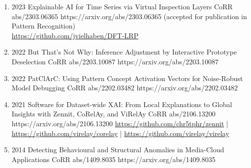 {\begin{enumerate}
        \item {}
                        {2023}
                        {Explainable AI for Time Series via Virtual Inspection Layers}
                        {CoRR abs/2303.06365}
                        {https://arxiv.org/abs/2303.06365}
                        {(accepted for publication in Pattern Recognition)\\ \href{https://github.com/jvielhaben/DFT-LRP}{https://github.com/jvielhaben/DFT-LRP}}

        \item {}
                            {2022}
                            {But That's Not Why: Inference Adjustment by Interactive Prototype Deselection}
                            {CoRR abs/2203.10087}
                            {https://arxiv.org/abs/2203.10087}

        \item {}
                            {2022}
                            {PatClArC: Using Pattern Concept Activation Vectors for Noise-Robust Model Debugging}
                            {CoRR abs/2202.03482}
                            {https://arxiv.org/abs/2202.03482}

        \item {}
                            {2021}
                            {Software for Dataset-wide XAI: From Local Explanations to Global Insights with Zennit, CoRelAy, and ViRelAy}
                            {CoRR abs/2106.13200}
                            {https://arxiv.org/abs/2106.13200}
                            {   \href{https://github.com/chr5tphr/zennit}{https://github.com/chr5tphr/zennit} | \\
                                \href{https://github.com/virelay/corelay}{https://github.com/virelay/corelay} |
                                \href{https://github.com/virelay/virelay}{https://github.com/virelay/virelay}
                            }

        \item {}
                            {2014}
                            {Detecting Behavioural and Structural Anomalies in Media-Cloud Applications}
                            {CoRR abs/1409.8035}
                            {https://arxiv.org/abs/1409.8035}

    \end{enumerate}

}

